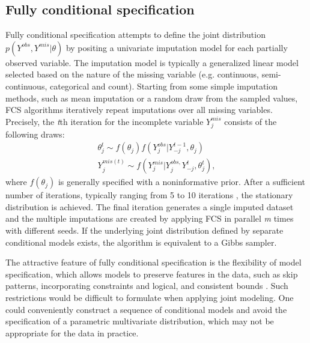 	\subsection{Fully conditional specification}
	Fully conditional specification attempts to define the joint distribution\\$p(Y^{obs}, Y^{mis}|\theta)$ by positing a univariate imputation model for each partially observed variable. The imputation model is typically a generalized linear model selected based on the nature of the missing variable (e.g. continuous, semi-continuous, categorical and count). Starting from some simple imputation methods, such as mean imputation or a random draw from the sampled values, FCS algorithms iteratively repeat imputations over all missing variables. Precisely, the \emph{t}th iteration for the incomplete variable \emph{$Y_{j}^{mis}$} consists of the following draws:
	\begin{align*}
		\theta_{j}^{t} \sim f(\theta_{j})f(Y_{j}^{obs}|Y_{-j}^{t-1}, \theta_{j})\\
		Y_{j}^{mis(t)} \sim f(Y_{j}^{mis}|Y_{j}^{obs, }Y_{-j}^{t}, \theta_{j}^{t}),
	\end{align*}
	where $f(\theta_{j})$ is generally specified with a noninformative prior. After a sufficient number of iterations, typically ranging from 5 to 10 iterations \citep{Buuren2018, oberman2020missing}, the stationary distribution is achieved. The final iteration generates a single imputed dataset and the multiple imputations are created by applying FCS in parallel \emph{m} times with different seeds. If the underlying joint distribution defined by separate conditional models exists, the algorithm is equivalent to a Gibbs sampler. 
	
	The attractive feature of fully conditional specification is the flexibility of model specification, which allows models to preserve features in the data, such as skip patterns, incorporating constraints and logical, and consistent bounds \citep{van2007multiple}. Such restrictions would be difficult to formulate when applying joint modeling. One could conveniently construct a sequence of conditional models and avoid the specification of a parametric multivariate distribution, which may not be appropriate for the data in practice.
	
